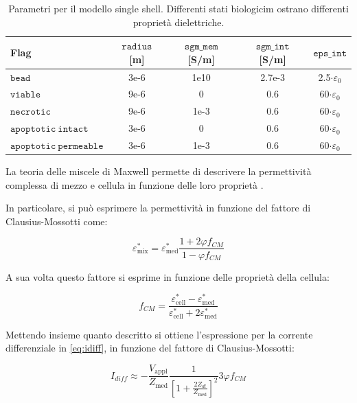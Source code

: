 \begin{table}[t!]
	\centering
	\small{
		\begin{tabular}{|l|c|c|c|c|}
			\hline
			Flag & $\mathtt{radius}$ [m] & $\mathtt{sgm\_mem}$ [S/m] &$\mathtt{ sgm\_int}$ [S/m] & $\mathtt{eps\_int }$ \\
			\hline
			$\mathtt{bead}$ & 3e-6 & 1e10 & 2.7e-3 & 2.5$\cdot \varepsilon_0$ \\
			\hline
			$\mathtt{viable}$ & 9e-6 & 0 & 0.6 & 60$\cdot \varepsilon_0$ \\
			\hline
			$\mathtt{necrotic}$ & 9e-6 & 1e-3 & 0.6 & 60$\cdot \varepsilon_0$ \\
			\hline
			$\mathtt{apoptotic \:intact}$ & 3e-6 & 0 & 0.6 & 60$\cdot \varepsilon_0$\\
			\hline
			$\mathtt{apoptotic\: permeable}$ & 3e-6 & 1e-3 & 0.6 & 60$\cdot \varepsilon_0$ \\
			\hline
	\end{tabular}}
	\caption{Parametri per il modello single shell. Differenti stati biologicim ostrano differenti proprietà dielettriche.}
	\label{tab:data}
\end{table}


La teoria delle miscele di Maxwell permette di descrivere la permettività complessa di mezzo e cellula in funzione delle loro proprietà \cite{hanai_method_1975}.

In particolare, si può esprimere la permettività in funzione del fattore di Clausius-Mossotti come:

\begin{equation}
	\varepsilon_{\operatorname{mix}}^{*}=\varepsilon_{\operatorname{m e d}}^{*} \frac{1+2 \varphi f_{C M}}{1-\varphi f_{C M}}
	\label{eq:permett}
\end{equation}

A sua volta questo fattore si esprime in funzione delle proprietà della cellula:

\begin{equation}
	f_{C M}=\frac{\varepsilon_{\operatorname{c e l l}}^{*}-\varepsilon_{\operatorname{m e d}}^{*}}{\varepsilon_{\operatorname{c e l l}}^{*}+2 \varepsilon_{\operatorname{m e d}}^{*}}
\end{equation}

Mettendo insieme quanto descritto si ottiene l'espressione per la corrente differenziale in \cref{eq:idiff}, in funzione del fattore di Clausius-Mossotti:

\begin{equation}
	I_{d i f f} \approx-\frac{V_{\operatorname{a p p l}}}{Z_{\operatorname{m e d}}} \frac{1}{\left[1+\frac{2 Z_{d l}}{Z_{\operatorname{m e d}}}\right]^{2}} 3 \varphi f_{CM}
\end{equation}

